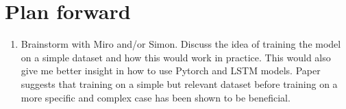\documentclass[a4paper,12pt,english]{article}
\begin{document}
\section*{Plan forward}
\begin{enumerate}
\item Brainstorm with Miro and/or Simon. Discuss the idea of training the model on a simple dataset and how this would work in practice. This would also give me better insight in how to use Pytorch and LSTM models. Paper \cite{hybrid_paper} suggests that training on a simple but relevant dataset before training on a more specific and complex case has been shown to be beneficial.
\end{enumerate}



\end{document}
